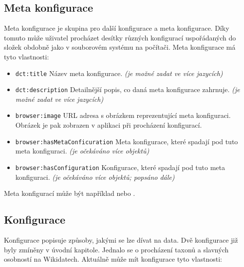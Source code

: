 \newpage

\subsection{Meta konfigurace} \label{pozadavky-metakonfigurace}
Meta konfigurace je skupina pro další konfigurace a meta konfigurace. Díky tomuto může uživatel procházet desítky různých konfigurací uspořádaných do složek obdobně jako v souborovém systému na počítači. Meta konfigurace má tyto vlastnosti:

\begin{itemize}
    \item \texttt{dct:title} Název meta konfigurace. \textit{(je možné zadat ve více jazycích)}
    \item \texttt{dct:description} Detailnější popis, co daná meta konfigurace zahrnuje. \textit{(je možné zadat ve více jazycích)}
    \item \texttt{browser:image} URL adresa s obrázkem reprezentující meta konfiguraci. Obrázek je pak zobrazen v aplikaci při procházení konfigurací.
    \item \texttt{browser:hasMetaConficuration} Meta konfigurace, které spadají pod tuto meta konfiguraci. \textit{(je očekáváno více objektů)}
    \item \texttt{browser:hasConfiguration} Konfigurace, které spadají pod tuto meta konfiguraci. \textit{(je očekáváno více objektů; popsáno dále)}
\end{itemize}

Meta konfigurací může být například  nebo .

\subsection{Konfigurace} \label{pozadavky-konfigurace}
Konfigurace popisuje způsoby, jakými se lze dívat na data. Dvě konfigurace již byly zmíněny v úvodní kapitole. Jednalo se o procházení taxonů a slavných osobností na Wikidatech. Aktuálně může mít konfigurace tyto vlastnosti:

